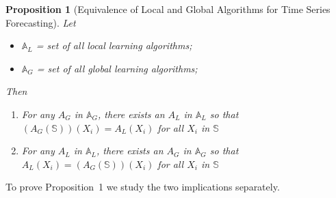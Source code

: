 \documentclass[a4paper]{article}
\theoremstyle{custom}
\newtheorem{proposition}{Proposition}
\begin{document}
\begin{proposition}[Equivalence of Local and Global Algorithms for Time Series Forecasting]

Let
\begin{itemize}
\item $\mathbb{A}_L$ = set of all local learning algorithms;
\item $\mathbb{A}_G$ = set of all global learning algorithms;
\end{itemize}
Then

\begin{enumerate}
\item For any $A_G$ in $\mathbb{A}_G$, there exists an $A_L$ in $\mathbb{A}_L$ so that $(A_G(\mathbb{S}))(X_i)=A_L(X_i)$ for all $X_i$ in $\mathbb{S} $
\item For any $A_L$ in $\mathbb{A}_L$, there exists an $A_G$ in $\mathbb{A}_G$ so that $A_L(X_i) = (A_G(\mathbb{S}))(X_i)$ for all $X_i$ in $\mathbb{S}$
\end{enumerate}

\end{proposition}

To prove Proposition~1 we study the two implications separately.
\end{document}

